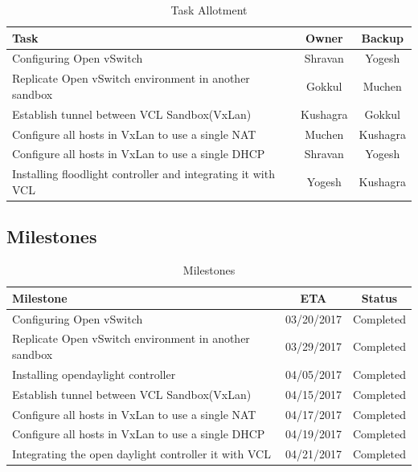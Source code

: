 \documentclass[12pt]{extarticle}
\begin{document}
\begin{center}
\begin{table}[H]
 \begin{tabular}{||l | c | c ||} 
 \hline
 Task & Owner & Backup \\ [2ex] 
 \hline\hline
  Configuring Open vSwitch & Shravan & Yogesh  \\
  \hline
  Replicate Open vSwitch environment in another sandbox & Gokkul & Muchen  \\ 
  \hline
  Establish tunnel between VCL Sandbox(VxLan) & Kushagra & Gokkul  \\ 
  \hline
  Configure all hosts in VxLan to use a single NAT & Muchen & Kushagra  \\ 
  \hline
  Configure all hosts in VxLan to use a single DHCP & Shravan & Yogesh  \\ 
  \hline
  Installing floodlight controller and integrating it with VCL & Yogesh & Kushagra  \\ 
 \hline
 \end{tabular}

\caption{Task Allotment}
\label{table:task}
\end{table}
\end{center}

\subsection{Milestones}
\begin{center}
\begin{table}[H]
 \begin{tabular}{||l | c | c ||} 
 \hline
 Milestone & ETA & Status \\ [2ex] 
 \hline\hline
  Configuring Open vSwitch & 03/20/2017 & Completed  \\
\hline
  Replicate Open vSwitch environment in another sandbox & 03/29/2017 & Completed  \\
  
   \hline
  Installing opendaylight controller  & 04/05/2017 & Completed  \\ 
  \hline
  Establish tunnel between VCL Sandbox(VxLan) & 04/15/2017 & Completed  \\ 
 
  \hline
  Configure all hosts in VxLan to use a single NAT & 04/17/2017 & Completed  \\ 
  \hline
  Configure all hosts in VxLan to use a single DHCP & 04/19/2017 & Completed  \\ 
  \hline
   Integrating the open daylight controller it with VCL & 04/21/2017 & Completed  \\ 
 \hline
 \end{tabular}
\caption{Milestones}
\label{table:milestone}
\end{table}
\end{center}
\end{document}
